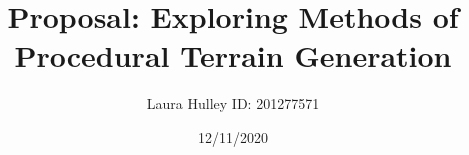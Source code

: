 \usepackage[utf8]{inputenc}
\title{Proposal: Exploring Methods of Procedural Terrain Generation}
\author{Laura Hulley ID: 201277571}
\date{12/11/2020}
\usepackage{url}
\usepackage{float}
\usepackage{wrapfig}
\usepackage{graphicx}
\graphicspath{ {images/} }
